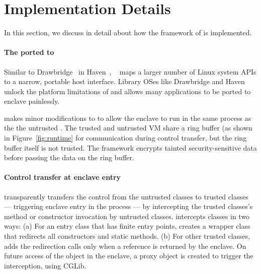 \section{Implementation Details}
\label{sec:implementation}

In this section, we discuss in detail about how the framework of \sysname{}
is implemented. 

\paragraph{The \graphene{} \libos{} ported to \sgx{}}
Similar to Drawbridge~\cite{porter11drawbridge}
in Haven~\cite{baumann14haven},
\graphene{}~\cite{tsai14graphene} maps a larger number of Linux system APIs
to a narrow, portable host interface.
Library OSes like Drawbridge and Haven unlock the platform limitations of \sgx{} and
allows many applications to be ported to enclave painlessly.

 
\sysname{} makes minor modifications to \graphene{} to allow
the enclave to run
in the same process as the the untrusted \jvm{}.
The trusted and untrusted VM share a ring buffer (as shown in Figure~\ref{fig:runtime} for communication during control transfer,
but the ring buffer itself is not trusted. The \sysname{} framework encrypts tainted security-sensitive data before passing the data on the ring buffer.
 
\paragraph{Control transfer at enclave entry}

\sysname{} transparently transfers the control from the untrusted classes to trusted classes --- triggering enclave entry in the process ---
by intercepting the trusted classes's method or constructor invocation by untrusted classes.
\sysname{} intercepts classes in two ways:
(a) For an entry class that has finite entry points,
\sysname{} creates a wrapper class that redirects all constructors and static methods.
(b) For other trusted classes, \sysname{} adds the redirection calls only when a reference is returned by the enclave. %
On future access of the object in the enclave, a proxy object is created to trigger the interception, using CGLib.

